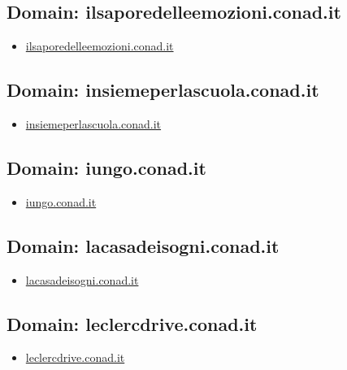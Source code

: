 \documentclass{article}
\begin{document}
    \subsection{Domain: ilsaporedelleemozioni.conad.it}
    \begin{itemize}
        
            
            \item \href{ http://ilsaporedelleemozioni.conad.it/}{ ilsaporedelleemozioni.conad.it }
            
        
    \end{itemize}

    \subsection{Domain: insiemeperlascuola.conad.it}
    \begin{itemize}
        
            
            \item \href{ https://insiemeperlascuola.conad.it/atpc/insiemeperlascuola/j/home}{ insiemeperlascuola.conad.it }
            
        
    \end{itemize}

    \subsection{Domain: iungo.conad.it}
    \begin{itemize}
        
            
            \item \href{ http://iungo.conad.it}{ iungo.conad.it }
            
        
    \end{itemize}

    \subsection{Domain: lacasadeisogni.conad.it}
    \begin{itemize}
        
            
            \item \href{ http://lacasadeisogni.conad.it/}{ lacasadeisogni.conad.it }
            
        
    \end{itemize}

    \subsection{Domain: leclercdrive.conad.it}
    \begin{itemize}
        
            
            \item \href{ http://leclercdrive.conad.it/}{ leclercdrive.conad.it }
            
        
    \end{itemize}
\end{document}
